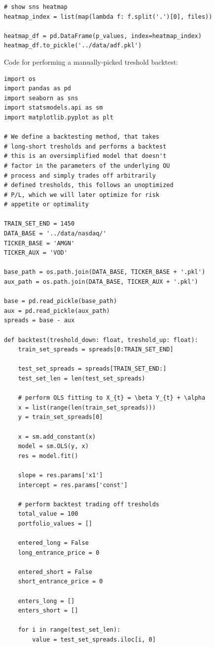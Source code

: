 \documentclass{article}
\begin{document}
\begin{spacing}{2.0}
\begin{lstlisting}
# show sns heatmap
heatmap_index = list(map(lambda f: f.split('.')[0], files))

heatmap_df = pd.DataFrame(p_values, index=heatmap_index)
heatmap_df.to_pickle('../data/adf.pkl')
\end{lstlisting}

Code for performing a manually-picked treshold backtest:

\begin{lstlisting}
import os
import pandas as pd
import seaborn as sns
import statsmodels.api as sm
import matplotlib.pyplot as plt

# We define a backtesting method, that takes
# long-short tresholds and performs a backtest
# this is an oversimplified model that doesn't
# factor in the parameters of the underlying OU
# process and simply trades off arbitrarily
# defined tresholds, this follows an unoptimized
# P/L, which we will later optimize for risk
# appetite or optimality

TRAIN_SET_END = 1450
DATA_BASE = '../data/nasdaq/'
TICKER_BASE = 'AMGN'
TICKER_AUX = 'VOD'

base_path = os.path.join(DATA_BASE, TICKER_BASE + '.pkl')
aux_path = os.path.join(DATA_BASE, TICKER_AUX + '.pkl')

base = pd.read_pickle(base_path)
aux = pd.read_pickle(aux_path)
spreads = base - aux

def backtest(treshold_down: float, treshold_up: float):
    train_set_spreads = spreads[0:TRAIN_SET_END]

    test_set_spreads = spreads[TRAIN_SET_END:]
    test_set_len = len(test_set_spreads)

    # perform OLS fitting to X_{t} = \beta Y_{t} + \alpha
    x = list(range(len(train_set_spreads)))
    y = train_set_spreads[0]

    x = sm.add_constant(x)
    model = sm.OLS(y, x)
    res = model.fit()

    slope = res.params['x1']
    intercept = res.params['const']

    # perform backtest trading off tresholds
    total_value = 100
    portfolio_values = []

    entered_long = False
    long_entrance_price = 0

    entered_short = False
    short_entrance_price = 0

    enters_long = []
    enters_short = []

    for i in range(test_set_len):
        value = test_set_spreads.iloc[i, 0]


\end{lstlisting}
\end{spacing}
\end{document}
